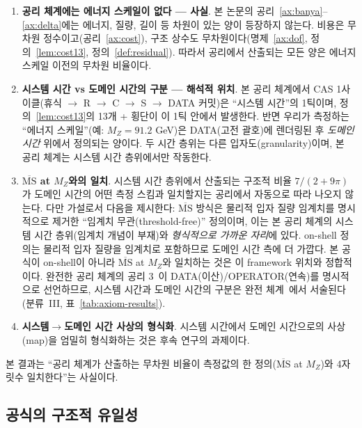 \documentclass[entropy,article,submit,pdftex,oneauthor]{Definitions/mdpi}
\begin{document}
\begin{enumerate}
\item \textbf{공리 체계에는 에너지 스케일이 없다 — 사실}. 본 논문의 공리~\ref{ax:banya}--\ref{ax:delta}에는 에너지, 질량, 길이 등 차원이 있는 양이 등장하지 않는다. 비용은 무차원 정수이고(공리~\ref{ax:cost}), 구조 상수도 무차원이다(명제~\ref{ax:dof}, 정의~\ref{lem:cost13}, 정의~\ref{def:residual}). 따라서 공리에서 산출되는 모든 양은 에너지 스케일 이전의 무차원 비율이다.

\item \textbf{시스템 시간 vs 도메인 시간의 구분 — 해석적 위치}. 본 공리 체계에서 CAS 1사이클(휴식 $\to$ R $\to$ C $\to$ S $\to$ DATA 커밋)은 ``시스템 시간''의 1틱이며, 정의~\ref{lem:cost13}의 13개 + 횡단이 이 1틱 안에서 발생한다. 반면 우리가 측정하는 ``에너지 스케일''(예: $M_Z = 91.2$ GeV)은 DATA(고전 괄호)에 렌더링된 후 \emph{도메인 시간} 위에서 정의되는 양이다. 두 시간 층위는 다른 입자도(granularity)이며, 본 공리 체계는 시스템 시간 층위에서만 작동한다.

\item \textbf{$\overline{\mathrm{MS}}$ at $M_Z$와의 일치}. 시스템 시간 층위에서 산출되는 구조적 비율 $7/(2+9\pi)$가 도메인 시간의 어떤 측정 스킴과 일치할지는 공리에서 자동으로 따라 나오지 않는다. 다만 가설로서 다음을 제시한다: $\overline{\mathrm{MS}}$ 방식은 물리적 입자 질량 임계치를 명시적으로 제거한 ``임계치 무관(threshold-free)'' 정의이며, 이는 본 공리 체계의 시스템 시간 층위(임계치 개념이 부재)와 \emph{형식적으로 가까운 자리}에 있다. on-shell 정의는 물리적 입자 질량을 임계치로 포함하므로 도메인 시간 측에 더 가깝다. 본 공식이 on-shell이 아니라 $\overline{\mathrm{MS}}$ at $M_Z$와 일치하는 것은 이 framework 위치와 정합적이다. 완전한 공리 체계의 공리 3~\cite{han2026}이 DATA(이산)/OPERATOR(연속)를 명시적으로 선언하므로, 시스템 시간과 도메인 시간의 구분은 완전 체계~\cite{han2026}에서 서술된다 (분류~III, 표~\ref{tab:axiom-results}).

\item \textbf{시스템$\to$도메인 시간 사상의 형식화}. 시스템 시간에서 도메인 시간으로의 사상(map)을 엄밀히 형식화하는 것은 후속 연구의 과제이다.
\end{enumerate}

본 결과는 ``공리 체계가 산출하는 무차원 비율이 측정값의 한 정의($\overline{\mathrm{MS}}$ at $M_Z$)와 4자릿수 일치한다''는 사실이다.

\subsection{공식의 구조적 유일성}
\end{document}
